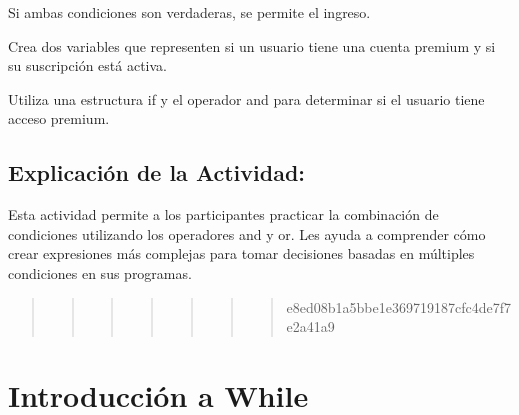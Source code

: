\documentclass[
  a4paper,
  onepage,
  openany]{scrreprt}
\begin{document}
Si ambas condiciones son verdaderas, se permite el ingreso.

\begin{tcolorbox}[enhanced jigsaw, breakable, opacityback=0, toptitle=1mm, coltitle=black, toprule=.15mm, rightrule=.15mm, colframe=quarto-callout-important-color-frame, opacitybacktitle=0.6, arc=.35mm, title=\textcolor{quarto-callout-important-color}{\faExclamation}\hspace{0.5em}{Actividad Práctica:}, titlerule=0mm, colbacktitle=quarto-callout-important-color!10!white, bottomtitle=1mm, bottomrule=.15mm, colback=white, left=2mm, leftrule=.75mm]

Crea dos variables que representen si un usuario tiene una cuenta
premium y si su suscripción está activa.

Utiliza una estructura if y el operador and para determinar si el
usuario tiene acceso premium.

\end{tcolorbox}

\hypertarget{explicaciuxf3n-de-la-actividad-33}{%
\section{Explicación de la
Actividad:}\label{explicaciuxf3n-de-la-actividad-33}}

Esta actividad permite a los participantes practicar la combinación de
condiciones utilizando los operadores and y or. Les ayuda a comprender
cómo crear expresiones más complejas para tomar decisiones basadas en
múltiples condiciones en sus programas.

\begin{quote}
\begin{quote}
\begin{quote}
\begin{quote}
\begin{quote}
\begin{quote}
\begin{quote}
e8ed08b1a5bbe1e369719187cfc4de7f7e2a41a9
\end{quote}
\end{quote}
\end{quote}
\end{quote}
\end{quote}
\end{quote}
\end{quote}

\hypertarget{introducciuxf3n-a-while}{%
\chapter{Introducción a While}\label{introducciuxf3n-a-while}}
\end{document}
